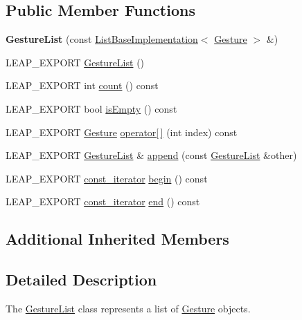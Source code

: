 \subsection*{Public Member Functions}
\begin{DoxyCompactItemize}
\item 
\hypertarget{class_leap_1_1_gesture_list_ac514c84e0d23171471f803354b933044}{{\bfseries Gesture\+List} (const \hyperlink{class_leap_1_1_list_base_implementation}{List\+Base\+Implementation}$<$ \hyperlink{class_leap_1_1_gesture}{Gesture} $>$ \&)}\label{class_leap_1_1_gesture_list_ac514c84e0d23171471f803354b933044}

\item 
L\+E\+A\+P\+\_\+\+E\+X\+P\+O\+R\+T \hyperlink{class_leap_1_1_gesture_list_aad564fe5be92fb93119da56f08963142}{Gesture\+List} ()
\item 
L\+E\+A\+P\+\_\+\+E\+X\+P\+O\+R\+T int \hyperlink{class_leap_1_1_gesture_list_afd1d3dc2a25c58971268854f69fdbd2b}{count} () const 
\item 
L\+E\+A\+P\+\_\+\+E\+X\+P\+O\+R\+T bool \hyperlink{class_leap_1_1_gesture_list_a78d661b2023275efa32e3a4f25f45c18}{is\+Empty} () const 
\item 
L\+E\+A\+P\+\_\+\+E\+X\+P\+O\+R\+T \hyperlink{class_leap_1_1_gesture}{Gesture} \hyperlink{class_leap_1_1_gesture_list_ab033b8dc70c9f5e22ae3a24b070d3ff7}{operator\mbox{[}$\,$\mbox{]}} (int index) const 
\item 
L\+E\+A\+P\+\_\+\+E\+X\+P\+O\+R\+T \hyperlink{class_leap_1_1_gesture_list}{Gesture\+List} \& \hyperlink{class_leap_1_1_gesture_list_a377880f99549807dc965087ca14e34f1}{append} (const \hyperlink{class_leap_1_1_gesture_list}{Gesture\+List} \&other)
\item 
L\+E\+A\+P\+\_\+\+E\+X\+P\+O\+R\+T \hyperlink{class_leap_1_1_gesture_list_aaf2fd030e686892a0da42d81fc0cad88}{const\+\_\+iterator} \hyperlink{class_leap_1_1_gesture_list_a1bdcb355a35074a9155581f9ab3aa191}{begin} () const 
\item 
L\+E\+A\+P\+\_\+\+E\+X\+P\+O\+R\+T \hyperlink{class_leap_1_1_gesture_list_aaf2fd030e686892a0da42d81fc0cad88}{const\+\_\+iterator} \hyperlink{class_leap_1_1_gesture_list_adcf2569b3e79c64fd70e02514058559d}{end} () const 
\end{DoxyCompactItemize}
\subsection*{Additional Inherited Members}


\subsection{Detailed Description}
The \hyperlink{class_leap_1_1_gesture_list}{Gesture\+List} class represents a list of \hyperlink{class_leap_1_1_gesture}{Gesture} objects.


